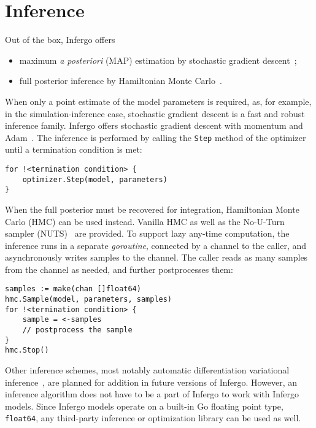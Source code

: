 \documentclass[sigplan,review,10pt,anonymous]{acmart}
\begin{document}
\begin{sloppypar}
\section{Inference}

Out of the box, Infergo offers 
\begin{itemize}
	\item maximum \textit{a posteriori} (MAP) estimation by stochastic
		gradient descent~\cite{R16}; 
	\item full posterior inference by Hamiltonian Monte
		Carlo~\cite{N12,HG11}.
\end{itemize}

When only a point estimate of the model parameters is required,
as, for example, in the simulation-inference case, stochastic
gradient descent is a fast and robust inference family. Infergo
offers stochastic gradient descent with momentum and
Adam~\cite{KB15}.  The inference is performed by calling the
\lstinline{Step} method of the optimizer until a termination
condition is met:
\begin{lstlisting}
for !<termination condition> {
    optimizer.Step(model, parameters)
}
\end{lstlisting}

When the full posterior must be recovered for integration,
Hamiltonian Monte Carlo (HMC) can be used instead. Vanilla HMC
as well as the No-U-Turn sampler (NUTS)~\cite{HG11} are
provided. To support lazy any-time computation, the inference
runs in a separate \textit{goroutine}, connected by a channel to
the caller, and asynchronously writes samples to the channel.
The caller reads as many samples from the channel as needed, and
further postprocesses them:
\begin{lstlisting}
samples := make(chan []float64)
hmc.Sample(model, parameters, samples)
for !<termination condition> {
	sample = <-samples
	// postprocess the sample
}
hmc.Stop()
\end{lstlisting}

Other inference schemes, most notably automatic differentiation
variational inference~\cite{KTR+17}, are planned for addition
in future versions of Infergo. However, an inference algorithm
does not have to be a part of Infergo to work with Infergo
models. Since Infergo models operate on a built-in Go floating
point type, \lstinline{float64}, any third-party inference or
optimization library can be used as well. 


\end{sloppypar}
\end{document}
